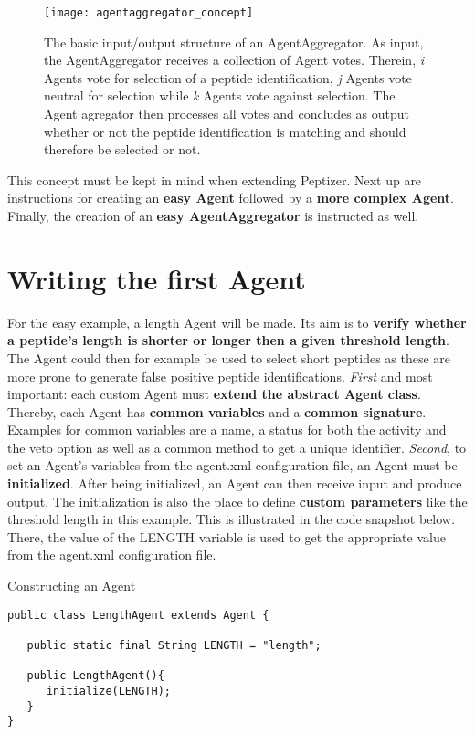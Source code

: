 \begin{figure}[H]
\begin{center}
	\texttt{[image: agentaggregator\_concept]}
	\caption{\label{agentaggregator_concept} The basic input/output structure of an AgentAggregator. As input, the AgentAggregator receives a collection of Agent votes. Therein, \textit{i} Agents vote for selection of a peptide identification, \textit{j} Agents vote neutral for selection while \textit{k} Agents vote against selection. The Agent agregator then processes all votes and concludes as output whether or not the peptide identification is matching and should therefore be selected or not.}
\end{center}
\end{figure}
%
\npar This concept must be kept in mind when extending Peptizer. Next up are instructions for creating an \textbf{easy Agent} followed by a \textbf{more complex Agent}. Finally, the creation of an\textbf{ easy AgentAggregator }is instructed as well.

\section{Writing the first Agent}
\npar For the easy example, a length Agent will be made. Its aim is to \textbf{verify whether a peptide's length is shorter or longer then a given threshold length}. The Agent could then for example be used to select short peptides as these are more prone to generate false positive peptide identifications.
\npar \textit{First} and most important: each custom Agent must \textbf{extend the abstract Agent class}. Thereby, each Agent has \textbf{common variables} and a \textbf{common signature}. Examples for common variables are a name, a status for both the activity and the veto option as well as a common method to get a unique identifier.
\npar \textit{Second}, to set an Agent's variables from the agent.xml configuration file, an Agent must be \textbf{initialized}. After being initialized, an Agent can then receive input and produce output. The initialization is also the place to define \textbf{custom parameters} like the threshold length in this example. This is illustrated in the code snapshot below. There, the value of the LENGTH variable is used to get the appropriate value from the agent.xml configuration file.

%
%
\begin{algorithm}[H]
\caption{Constructing an Agent}
\scriptsize
\vspace{0.3cm}
\begin{verbatim}
public class LengthAgent extends Agent {

   public static final String LENGTH = "length";
	
   public LengthAgent(){
      initialize(LENGTH);
   }
}
\end{verbatim}
\end{algorithm}
%


